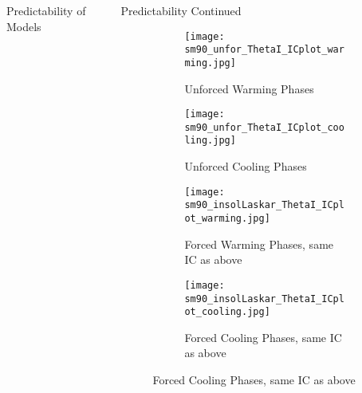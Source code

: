 \documentclass[final]{beamer}
\newlength{\sepwid}
\newlength{\onecolwid}
\begin{document}
\begin{frame}[t]
\begin{columns}[t]
\begin{column}{\onecolwid}
\begin{block}{Predictability of Models}
    \end{block}
    
    \end{column}
    \begin{column}{\sepwid}\end{column}
    \begin{column}{\onecolwid}
    \begin{block}{Predictability Continued}
    \begin{figure}
      	\centering
      	\begin{subfigure}{.5\textwidth}
      		\centering
      		\texttt{[image: sm90\_unfor\_ThetaI\_ICplot\_warming.jpg]}
      		\caption{Unforced Warming Phases}
      		\label{4a}
      	\end{subfigure}%
      	\begin{subfigure}{.5\textwidth}
      		\centering
			\texttt{[image: sm90\_unfor\_ThetaI\_ICplot\_cooling.jpg]}
      		\caption{Unforced Cooling Phases}
      		\label{4b}
      	\end{subfigure}
      	\begin{subfigure}{.5\textwidth}
      		\centering
      		\texttt{[image: sm90\_insolLaskar\_ThetaI\_ICplot\_warming.jpg]}
      		\caption{Forced Warming Phases, same IC as above}
      		\label{4c}
      	\end{subfigure}%
      	\begin{subfigure}{.5\textwidth}
      		\centering
      		\texttt{[image: sm90\_insolLaskar\_ThetaI\_ICplot\_cooling.jpg]}
      		\caption{Forced Cooling Phases, same IC as above}
      		\label{4d}
      	\end{subfigure}%
      	\end{figure}

\end{block}
\end{column}
\end{columns}
\end{frame}
\end{document}
